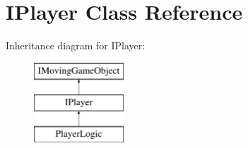 \hypertarget{class_i_player}{}\section{I\+Player Class Reference}
\label{class_i_player}
Inheritance diagram for I\+Player\+:\begin{figure}[H]
\begin{center}
\leavevmode
\includegraphics[height=3.000000cm]{class_i_player}
\end{center}
\end{figure}
